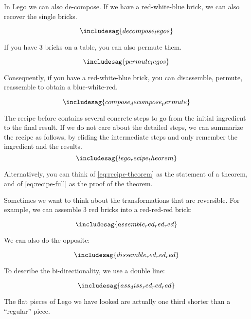 In Lego we can also de-compose. If we have a red-white-blue brick, we can also recover
the single bricks.

\begin{equation}
  \includesag{decompose_legos}
\end{equation}

If you have 3 bricks on a table, you can also permute them.

\begin{equation}
\includesag{permute_legos}
\end{equation}

Consequently, if you have a red-white-blue brick, you can disassemble, permute, reassemble to obtain a blue-white-red.

\begin{equation}
  \label{eq:recipe-full}
\includesag{compose_decompose_permute}
\end{equation}


The recipe before contains several concrete steps to go from the initial ingredient to the final result.
If we do not care about the detailed steps, we can summarize the recipe as follows, by eliding the intermediate steps and only remember the ingredient and the results.
\begin{equation}\label{eq:recipe-theorem}
\includesag{lego_recipe_theorem}
\end{equation}

Alternatively, you can think of \cref{eq:recipe-theorem} as the statement of a theorem, and of \cref{eq:recipe-full} as the proof of the theorem.

Sometimes we want to think about the transformations that are reversible.
For example, we can assemble 3 red bricks into a red-red-red brick:

\begin{equation}
\includesag{assemble_red_red_red}
\end{equation}

We can also do the opposite:

\begin{equation}
\includesag{dissemble_red_red_red}
\end{equation}

To describe the bi-directionality, we use a double line:

\begin{equation}
\includesag{ass_diss_red_red_red}
\end{equation}

The flat pieces of Lego we have looked are actually one third shorter than a ``regular'' piece.

